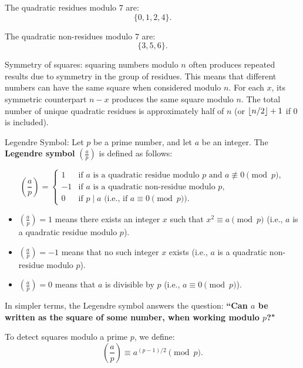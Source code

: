 The quadratic residues modulo \( 7 \) are:
\[
\{ 0, 1, 2, 4 \}.
\]

The quadratic non-residues modulo \( 7 \) are:
\[
\{ 3, 5, 6 \}.
\]
 
Symmetry of squares: squaring numbers modulo $n$ often produces repeated results due to symmetry in the group of residues. This means that different numbers can have the same square when considered modulo $n$. For each $x$, its symmetric counterpart $n-x$ produces the same square modulo $n$. The total number of unique quadratic residues is approximately half of $n$ (or $\left\lfloor n\slash2 \right\rfloor + 1$ if 0 is included).

\begin{defn}
    Legendre Symbol: Let \( p \) be a prime number, and let \( a \) be an integer. The \textbf{Legendre symbol} \( \left( \frac{a}{p} \right) \) is defined as follows:

    \[
    \left( \frac{a}{p} \right) =
    \begin{cases}
    1 & \text{if } a \text{ is a quadratic residue modulo } p \text{ and } a \not\equiv 0 \pmod{p}, \\
    -1 & \text{if } a \text{ is a quadratic non-residue modulo } p, \\
    0 & \text{if } p \mid a \text{ (i.e., if } a \equiv 0 \pmod{p}).
    \end{cases}
    \]
\end{defn}

\begin{itemize}
    \item \( \left( \frac{a}{p} \right) = 1 \) means there exists an integer \( x \) such that \( x^2 \equiv a \pmod{p} \) (i.e., \( a \) is a quadratic residue modulo \( p \)). \\
    \item \( \left( \frac{a}{p} \right) = -1 \) means that no such integer \( x \) exists (i.e., \( a \) is a quadratic non-residue modulo \( p \)). \\
    \item \( \left( \frac{a}{p} \right) = 0 \) means that \( a \) is divisible by \( p \) (i.e., \( a \equiv 0 \pmod{p} \)).
    
\end{itemize}

In simpler terms, the Legendre symbol answers the question: \textbf{``Can $a$ be written as the square of some number, when working modulo $p$?"}

To detect squares modulo a prime $p$, we define:
\begin{equation}
    \left( \frac{a}{p} \right) \equiv a^{(p-1)\slash2} \pmod{p}.
\end{equation}

